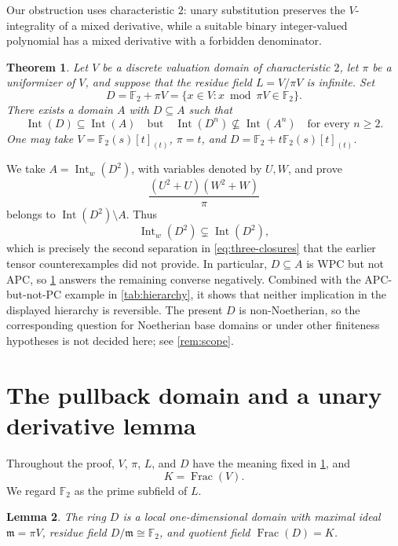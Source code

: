 \documentclass[11pt,reqno]{amsart}
\numberwithin{equation}{section}
\theoremstyle{plain}
\newtheorem{theorem}{Theorem}[section]
\newtheorem{lemma}[theorem]{Lemma}
\theoremstyle{definition}
\theoremstyle{remark}
\newcommand{\Int}{\operatorname{Int}}
\newcommand{\Frac}{\operatorname{Frac}}
\newcommand{\F}{\mathbb F}
\newcommand{\m}{\mathfrak m}
\begin{document}
Our obstruction uses characteristic \(2\): unary substitution preserves
the \(V\)-integrality of a mixed derivative, while a suitable binary
integer-valued polynomial has a mixed derivative with a forbidden
denominator.

\begin{theorem}\label{thm:main}
Let \(V\) be a discrete valuation domain of characteristic \(2\), let
\(\pi\) be a uniformizer of \(V\), and suppose that the residue field
\(L=V/\pi V\) is infinite.  Set
\[
 D=\F _2+\pi V
   =\{x\in V:x\bmod\pi V\in\F _2\}.
\]
There exists a domain \(A\) with \(D\subseteq A\) such that
\[
 \Int(D)\subseteq\Int(A)
 \quad\text{but}\quad
 \Int(D^n)\nsubseteq\Int(A^n)
 \quad\text{for every }n\geq2.
\]
One may take \(V=\F _2(s)[t]_{(t)}\), \(\pi=t\), and
\(D=\F _2+t\F _2(s)[t]_{(t)}\).
\end{theorem}

We take \(A=\Int_w(D^2)\), with variables denoted by \(U,W\), and prove
\[
 \frac{(U^2+U)(W^2+W)}{\pi}
\]
belongs to \(\Int(D^2)\setminus A\).  Thus
\[
 \Int_w(D^2)\subsetneq\Int(D^2),
\]
which is precisely the second separation in \eqref{eq:three-closures}
that the earlier tensor counterexamples did not provide.  In
particular, \(D\subseteq A\) is WPC but not APC, so
\cref{thm:main} answers the remaining converse negatively.  Combined
with the APC-but-not-PC example in \cref{tab:hierarchy}, it shows that
neither implication in the displayed hierarchy is reversible.  The present
\(D\) is non-Noetherian, so
the corresponding question for Noetherian base domains or under other
finiteness hypotheses is not decided here; see \cref{rem:scope}.

\section{The pullback domain and a unary derivative lemma}
\label{sec:pullback}

Throughout the proof, \(V\), \(\pi\), \(L\), and \(D\) have the meaning
fixed in \cref{thm:main}, and
\[
 K=\Frac(V).
\]
We regard \(\F _2\) as the prime subfield of \(L\).

\begin{lemma}\label{lem:D-structure}
The ring \(D\) is a local one-dimensional domain with maximal ideal
\(\m=\pi V\), residue field \(D/\m\cong\F _2\), and quotient field
\(\Frac(D)=K\).
\end{lemma}
\end{document}
